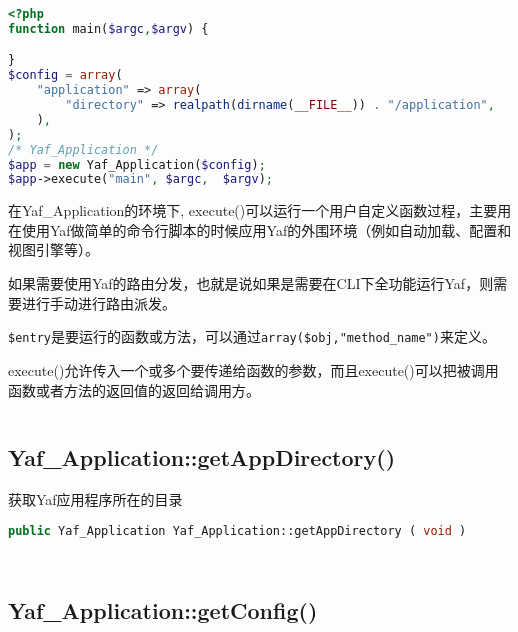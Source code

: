 \begin{lstlisting}[language=PHP]
<?php
function main($argc,$argv) {

}
$config = array(
    "application" => array(
        "directory" => realpath(dirname(__FILE__)) . "/application",
    ),
);
/* Yaf_Application */
$app = new Yaf_Application($config);
$app->execute("main", $argc,  $argv);
\end{lstlisting}

在Yaf\_Application的环境下, execute()可以运行一个用户自定义函数过程，主要用在使用Yaf做简单的命令行脚本的时候应用Yaf的外围环境（例如自动加载、配置和视图引擎等）。

如果需要使用Yaf的路由分发，也就是说如果是需要在CLI下全功能运行Yaf，则需要进行手动进行路由派发。

\texttt{\$entry}是要运行的函数或方法，可以通过\texttt{array(\$obj,"method\_name")}来定义。

execute()允许传入一个或多个要传递给函数的参数，而且execute()可以把被调用函数或者方法的返回值的返回给调用方。

\begin{lstlisting}[language=PHP]

\end{lstlisting}


\subsection{Yaf\_Application::getAppDirectory()}

获取Yaf应用程序所在的目录






\begin{lstlisting}[language=PHP]
public Yaf_Application Yaf_Application::getAppDirectory ( void )
\end{lstlisting}



\begin{lstlisting}[language=PHP]

\end{lstlisting}



\begin{lstlisting}[language=PHP]

\end{lstlisting}


\subsection{Yaf\_Application::getConfig()}

